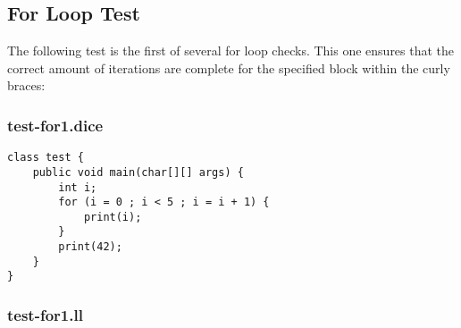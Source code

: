 \subsection{For Loop Test}
The following test is the first of several for loop checks. This one ensures that the correct amount of iterations are complete for the specified block within the curly braces:
\subsubsection{test-for1.dice}
\begin{verbatim}
class test {
	public void main(char[][] args) {
		int i;
		for (i = 0 ; i < 5 ; i = i + 1) {
			print(i);
		}
		print(42);
	}
}
\end{verbatim}
\subsubsection{test-for1.ll}
